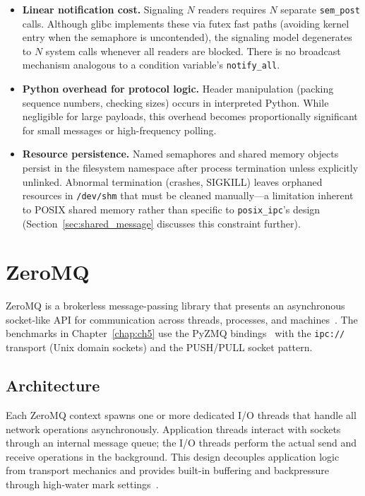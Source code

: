 \begin{itemize}
    \item \textbf{Linear notification cost.} Signaling $N$ readers requires $N$ separate \texttt{sem\_post} calls. Although glibc implements these via futex fast paths (avoiding kernel entry when the semaphore is uncontended), the signaling model degenerates to $N$ system calls whenever all readers are blocked. There is no broadcast mechanism analogous to a condition variable's \texttt{notify\_all}.

    \item \textbf{Python overhead for protocol logic.} Header manipulation (packing sequence numbers, checking sizes) occurs in interpreted Python. While negligible for large payloads, this overhead becomes proportionally significant for small messages or high-frequency polling.

    \item \textbf{Resource persistence.} Named semaphores and shared memory objects persist in the filesystem namespace after process termination unless explicitly unlinked. Abnormal termination (crashes, SIGKILL) leaves orphaned resources in \texttt{/dev/shm} that must be cleaned manually---a limitation inherent to POSIX shared memory rather than specific to \texttt{posix\_ipc}'s design (Section~\ref{sec:shared_message} discusses this constraint further).
\end{itemize}


\section{ZeroMQ}
\label{sec:zeromq}

ZeroMQ is a brokerless message-passing library that presents an asynchronous socket-like API for communication across threads, processes, and machines~\cite{zeromq2013}. The benchmarks in Chapter~\ref{chap:ch5} use the PyZMQ bindings~\cite{pyzmq, zeromq_guide} with the \texttt{ipc://} transport (Unix domain sockets) and the PUSH/PULL socket pattern.

\subsection{Architecture}

Each ZeroMQ context spawns one or more dedicated I/O threads that handle all network operations asynchronously. Application threads interact with sockets through an internal message queue; the I/O threads perform the actual send and receive operations in the background. This design decouples application logic from transport mechanics and provides built-in buffering and backpressure through high-water mark settings~\cite{zeromq2013}.


